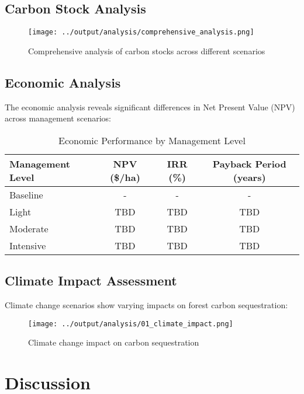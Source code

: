\documentclass[11pt,a4paper]{article}
\begin{document}
\subsection{Carbon Stock Analysis}

\begin{figure}[H]
\centering
\texttt{[image: ../output/analysis/comprehensive\_analysis.png]}
\caption{Comprehensive analysis of carbon stocks across different scenarios}
\label{fig:comprehensive}
\end{figure}

\subsection{Economic Analysis}

The economic analysis reveals significant differences in Net Present Value (NPV) across management scenarios:

\begin{table}[H]
\centering
\caption{Economic Performance by Management Level}
\begin{tabular}{@{}lccc@{}}
\toprule
Management Level & NPV (\$/ha) & IRR (\%) & Payback Period (years) \\
\midrule
Baseline & - & - & - \\
Light & TBD & TBD & TBD \\
Moderate & TBD & TBD & TBD \\
Intensive & TBD & TBD & TBD \\
\bottomrule
\end{tabular}
\label{tab:economics}
\end{table}

\subsection{Climate Impact Assessment}

Climate change scenarios show varying impacts on forest carbon sequestration:

\begin{figure}[H]
\centering
\texttt{[image: ../output/analysis/01\_climate\_impact.png]}
\caption{Climate change impact on carbon sequestration}
\label{fig:climate}
\end{figure}

\section{Discussion}
\end{document}
